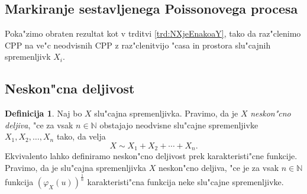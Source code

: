 \documentclass[12pt, a4paper, reqno]{amsart}
\theoremstyle{definition}
\newtheorem{definicija}{Definicija}[section]
\theoremstyle{plain}
\newtheorem{izrek}[definicija]{Izrek}
\newcommand{\N}{\mathbb{N}}
\newcommand{\1}{\mathds{1}}
\begin{document}
%
%
%
%            

    \subsection{Markiranje sestavljenega Poissonovega procesa}
        Poka"zimo obraten rezultat kot v trditvi \ref{trd:NXjeEnakoaY}, tako da raz"clenimo CPP na 
        ve"c neodvisnih CPP z raz"clenitvijo "casa in prostora slu"cajnih spremenljivk $X_i$.





















    \subsection{Neskon"cna deljivost}

    \begin{definicija}
        Naj bo $X$ slu"cajna spremenljivka. Pravimo, da je $X$ \textit{neskon"cno deljiva}, "ce za vsak $n\in\N$
        obstajajo neodvisne slu"cajne spremenljivke $X_1, X_2, \dots, X_n$ tako, da velja
        \begin{equation*}
            X \sim X_1 + X_2 + \cdots + X_n.
        \end{equation*}
        Ekvivalento lahko definiramo neskon"cno deljivost prek karakteristi"cne funkcije. Pravimo, da je
        slu"cajna spremenljivka $X$ neskon"cno deljiva, "ce je za vsak $n\in\N$ funkcija 
        $\left(\varphi_X(u)\right)^{\frac{1}{n}}$ karakteristi"cna funkcija neke slu"cajne spremenljivke.
    \end{definicija}
\end{document}

